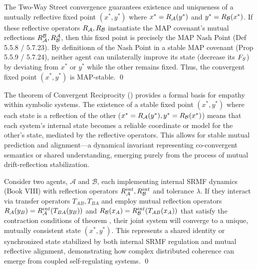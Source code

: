 \begin{demonstratio}
\label{demonstratio:bk7_map_stable_mutual_fixed_point}
The Two-Way Street convergence guarantees existence and uniqueness of a mutually reflective fixed point \((x^{\ast}, y^{\ast})\) where \(x^{\ast} = R_{\mathcal{A}}(y^{\ast})\) and \(y^{\ast} = R_{\mathcal{B}}(x^{\ast})\). If these reflective operators \(R_{\mathcal{A}}, R_{\mathcal{B}}\) instantiate the MAP covenant's mutual reflections \(R^{\mathcal{B}}_{\mathcal{A}}, R^{\mathcal{A}}_{\mathcal{B}}\), then this fixed point is precisely the MAP Nash Point (Def 5.5.8 / 5.7.23). By definitionn of the Nash Point in a stable MAP covenant (Prop 5.5.9 / 5.7.24), neither agent can unilaterally improve its state (decrease its \(F_S\)) by deviating from \(x^{\ast}\) or \(y^{\ast}\) while the other remains fixed. Thus, the convergent fixed point \((x^{\ast}, y^{\ast})\) is MAP-stable. \qed {}
\end{demonstratio}
\begin{remark}
\label{remark:bk7_empathy_as_dynamical_invariant}
The theorem of Convergent Reciprocity () provides a formal basis for empathy within symbolic systems. The existence of a stable fixed point \((x^{\ast}, y^{\ast})\) where each state is a reflection of the other (\(x^{\ast} = R_{\mathcal{A}}(y^{\ast}), y^{\ast} = R_{\mathcal{B}}(x^{\ast})\)) means that each system's internal state becomes a reliable coordinate or model for the other's state, mediated by the reflective operators. This allows for stable mutual prediction and alignment—a dynamical invariant representing co-convergent semantics or shared understanding, emerging purely from the process of mutual drift-reflection stabilization.
\end{remark}
\begin{scholium}
\label{scholium:bk7_srmf_coupled_agents}
Consider two agents, \(\mathcal{A}\) and \(\mathcal{B}\), each implementing internal SRMF dynamics (Book VIII) with reflection operators \(R_{\mathcal{A}}^{int}, R_{\mathcal{B}}^{int}\) and tolerance \(\lambda\). If they interact via transfer operators \(T_{AB}, T_{BA}\) and employ mutual reflection operators \(R_{\mathcal{A}}(y_B) = R_{\mathcal{A}}^{int}(T_{BA}(y_B))\) and \(R_{\mathcal{B}}(x_A) = R_{\mathcal{B}}^{int}(T_{AB}(x_A))\) that satisfy the contraction conditions of theorem , their joint system will converge to a unique, mutually consistent state \((x^{\ast}, y^{\ast})\). This represents a shared identity or synchronized state stabilized by both internal SRMF regulation and mutual reflective alignment, demonstrating how complex distributed coherence can emerge from coupled self-regulating systems. \qed {}
\end{scholium}
